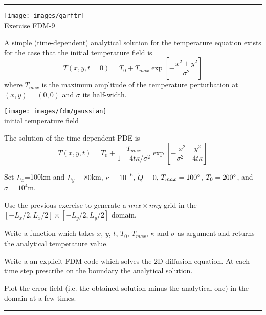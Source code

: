 \begin{center}
\begin{minipage}[t]{0.77\textwidth}
\par\noindent\rule{\textwidth}{0.4pt}
\begin{center}
\texttt{[image: images/garftr]} \\
{\color{orange}Exercise FDM-9}
\end{center}

A simple (time-dependent) analytical solution for the temperature equation exists for 
the case that the initial temperature field is
\begin{equation}
T(x,y,t=0) = T_0+ T_{max} \exp \left[ -\frac{x^2+y^2}{\sigma^2}   \right]
\end{equation}
where $T_{max}$ is the maximum amplitude of the temperature perturbation 
at $(x,y) = (0, 0)$ and $\sigma$ its half-width. 

\begin{center}
\texttt{[image: images/fdm/gaussian]}\\
{\captionfont initial temperature field}
\end{center}

The solution of the time-dependent PDE is
\begin{equation}
T(x,y,t)=T_0 + \frac{T_{max}}{1+4t\kappa/\sigma^2 } \exp \left[ -\frac{x^2+y^2}{\sigma^2 + 4t\kappa}   \right]
\end{equation}

Set $L_x$=100km and $L_y=80$km, $\kappa=10^{-6}$, $\tilde{Q}=0$, $T_{max}=100\degree$, $T_0=200\degree$, 
and $\sigma=10^4$m. 

Use the previous exercise to generate a $nnx\times nny$ grid 
in the $[-L_x/2,L_x/2]\times[-L_y/2,L_y/2]$ domain.

Write a function which takes $x$, $y$, $t$, $T_0$, $T_{max}$, $\kappa$ and $\sigma$ as argument 
and returns the analytical temperature value.

Write a an explicit FDM code which solves the 2D diffusion equation. At each time step 
prescribe on the boundary the analytical solution.  

Plot the error field
(i.e. the obtained solution minus the analytical one)
in the domain at a few times.

\par\noindent\rule{\textwidth}{0.4pt}
\end{minipage}
\end{center}




